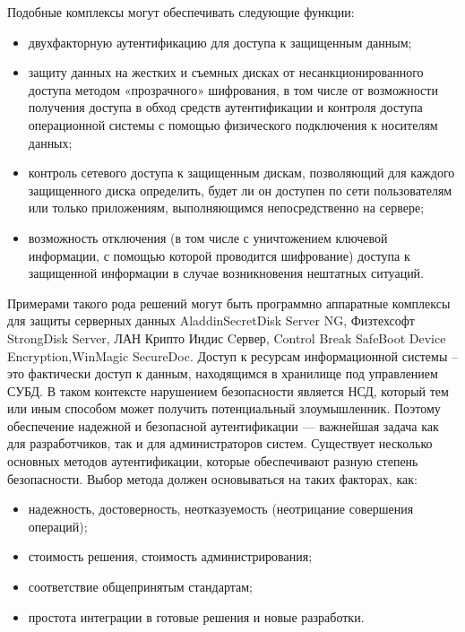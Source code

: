 Подобные комплексы могут обеспечивать следующие функции:
\begin{itemize}
  \item двухфакторную аутентификацию для доступа к защищенным данным;
  \item защиту данных
на жестких и съемных дисках от несанкционированного доступа методом
«прозрачного» шифрования, в том числе от возможности получения доступа в обход
средств аутентификации и контроля доступа операционной системы с помощью
физического подключения к носителям данных;
  \item контроль сетевого доступа к
защищенным дискам, позволяющий для каждого защищенного диска определить, будет
ли он доступен по сети пользователям или только приложениям, выполняющимся
непосредственно на сервере;
  \item возможность отключения (в том числе с уничтожением
ключевой информации, с помощью которой проводится шифрование) доступа к
защищенной информации в случае возникновения нештатных ситуаций.
\end{itemize}

Примерами такого рода решений могут быть программно аппаратные комплексы для
защиты серверных данных AladdinSecretDisk Server NG, Физтехсофт StrongDisk
Server, ЛАН Крипто Индис Cервер, Control Break SafeBoot Device
Encryption,WinMagic SecureDoc. Доступ к ресурсам информационной системы -- это
фактически доступ к данным, находящимся в хранилище под управлением
СУБД. В таком контексте нарушением безопасности является НСД, который тем или
иным способом может получить потенциальный злоумышленник. Поэтому обеспечение
надежной и безопасной аутентификации — важнейшая задача как для разработчиков,
так и для администраторов систем. Существует несколько основных методов
аутентификации, которые обеспечивают разную степень безопасности. Выбор метода
должен основываться на таких факторах, как:
\begin{itemize}
  \item надежность, достоверность, неотказуемость (неотрицание совершения
  операций);
  \item стоимость решения, стоимость администрирования;
  \item соответствие общепринятым
стандартам;
  \item простота интеграции в готовые решения и новые разработки.
\end{itemize}

